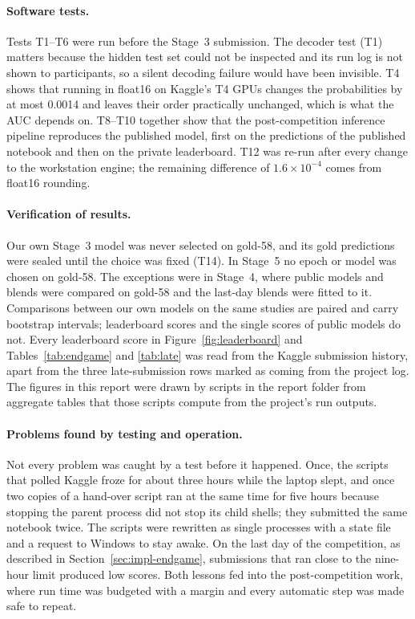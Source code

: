 \paragraph{Software tests.} Tests T1--T6 were run before the Stage~3 submission. The decoder test (T1) matters because the hidden test set could not be inspected and its run log is not shown to participants, so a silent decoding failure would have been invisible. T4 shows that running in float16 on Kaggle's T4 GPUs changes the probabilities by at most 0.0014 and leaves their order practically unchanged, which is what the AUC depends on. T8--T10 together show that the post-competition inference pipeline reproduces the published model, first on the predictions of the published notebook and then on the private leaderboard. T12 was re-run after every change to the workstation engine; the remaining difference of $1.6\times10^{-4}$ comes from float16 rounding.

\paragraph{Verification of results.} Our own Stage~3 model was never selected on gold-58, and its gold predictions were sealed until the choice was fixed (T14). In Stage~5 no epoch or model was chosen on gold-58. The exceptions were in Stage~4, where public models and blends were compared on gold-58 and the last-day blends were fitted to it. Comparisons between our own models on the same studies are paired and carry bootstrap intervals; leaderboard scores and the single scores of public models do not. Every leaderboard score in Figure~\ref{fig:leaderboard} and Tables~\ref{tab:endgame} and \ref{tab:late} was read from the Kaggle submission history, apart from the three late-submission rows marked as coming from the project log. The figures in this report were drawn by scripts in the report folder from aggregate tables that those scripts compute from the project's run outputs.

\paragraph{Problems found by testing and operation.} Not every problem was caught by a test before it happened. Once, the scripts that polled Kaggle froze for about three hours while the laptop slept, and once two copies of a hand-over script ran at the same time for five hours because stopping the parent process did not stop its child shells; they submitted the same notebook twice. The scripts were rewritten as single processes with a state file and a request to Windows to stay awake. On the last day of the competition, as described in Section~\ref{sec:impl-endgame}, submissions that ran close to the nine-hour limit produced low scores. Both lessons fed into the post-competition work, where run time was budgeted with a margin and every automatic step was made safe to repeat.

